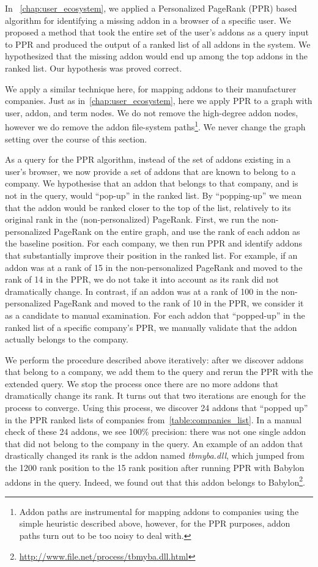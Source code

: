 \documentclass[ijoc,nonblindrev]{informs3} %
\numberwithin{equation}{subsection}
\begin{document}
In ~\autoref{chap:user_ecosystem}, we applied a Personalized PageRank (PPR) based algorithm for identifying a missing addon in a browser of a specific user. We proposed a method that took the entire set of the user's addons as a query input to PPR and produced the output of a ranked list of all addons in the system. We hypothesized that the missing addon would end up among the top addons in the ranked list. Our hypothesis was proved correct.

We apply a similar technique here, for mapping addons to their manufacturer companies. 
Just as in~\autoref{chap:user_ecosystem}, here we apply PPR to a graph with user, addon, and term nodes. We do not remove the high-degree addon nodes, however we do remove the addon file-system paths\footnote{Addon paths are instrumental for mapping addons to companies using the simple heuristic described above, however, for the PPR purposes, addon paths turn out to be too noisy to deal with.}. We never change the graph setting over the course of this section.

As a query for the PPR algorithm, instead of the set of addons existing in a user's browser, we now provide a set of addons that are known to belong to a company. We hypothesise that an addon that belongs to that company, and is not in the query, would ``pop-up'' in the ranked list. By ``popping-up'' we mean that the addon would be ranked closer to the top of the list, relatively to its original rank in the (non-personalized) PageRank. First, we run the non-personalized PageRank on the entire graph, and use the rank of each addon as the baseline position. For each company, we then run PPR and identify addons that substantially improve their position in the ranked list. For example, if an addon was at a rank of 15 in the non-personalized PageRank and moved to the rank of 14 in the PPR, we do not take it into account as its rank did not dramatically change. In contrast, if an addon was at a rank of 100 in the non-personalized PageRank and moved to the rank of 10 in the PPR, we consider it as a candidate to manual examination. For each addon that ``popped-up'' in the ranked list of a specific company's PPR, we manually validate that the addon actually belongs to the company.

We perform the procedure described above iteratively: after we discover addons that belong to a company, we add them to the query and rerun the PPR with the extended query. We stop the process once there are no more addons that dramatically change its rank. It turns out that two iterations are enough for the process to converge. Using this process, we discover 24 addons that ``popped up'' in the PPR ranked lists of companies from~\autoref{table:companies_list}. In a manual check of these 24 addons, we see 100\% precision: there was not one single addon that did not belong to the company in the query. An example of an addon that drastically changed its rank is the addon named \emph{tbmyba.dll}, which jumped from the 1200 rank position to the 15 rank position after running PPR with Babylon addons in the query. Indeed, we found out that this addon belongs to Babylon\footnote{\url{http://www.file.net/process/tbmyba.dll.html}}.
\end{document}
